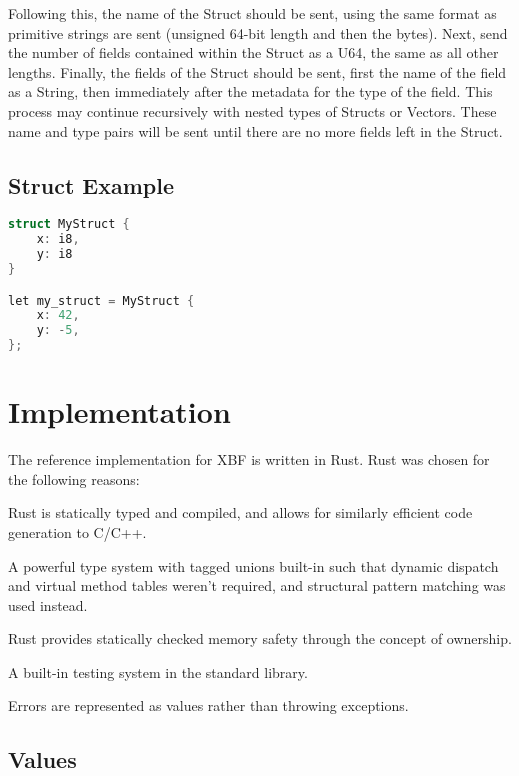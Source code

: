 \documentclass[conference]{IEEEtran}
\begin{document}
Following this, the name of the Struct should be sent, using the same format as primitive strings are sent (unsigned 64-bit length and then the bytes). Next, send the number of fields contained within the Struct as a U64, the same as all other lengths. Finally, the fields of the Struct should be sent, first the name of the field as a String, then immediately after the metadata for the type of the field. This process may continue recursively with nested types of Structs or Vectors. These name and type pairs will be sent until there are no more fields left in the Struct.

\subsection{Struct Example}

\begin{lstlisting}[language=C]
struct MyStruct {
	x: i8,
	y: i8
}

let my_struct = MyStruct {
	x: 42,
	y: -5,
};
\end{lstlisting}

\section{Implementation}

The reference implementation for XBF\cite{xbf_impl} is written in Rust\cite{rust}. Rust was chosen for the following reasons:

\begin{IEEEitemize}
	\item Rust is statically typed and compiled, and allows for similarly efficient code generation to C/C++.
	\item A powerful type system with tagged unions built-in\cite{enums} such that dynamic dispatch and virtual method tables weren't required, and structural pattern matching was used instead.
	\item Rust provides statically checked memory safety through the concept of ownership\cite{ownership}.
	\item A built-in testing system in the standard library\cite{testing}.
	\item Errors are represented as values rather than throwing exceptions\cite{results}.
\end{IEEEitemize}

\subsection{Values}
\end{document}
